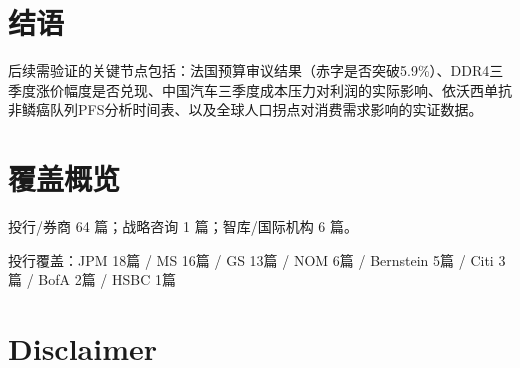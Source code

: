 \documentclass[11pt]{ctexart}
\begin{document}
\section{结语}
后续需验证的关键节点包括：法国预算审议结果（赤字是否突破5.9\%）、DDR4三季度涨价幅度是否兑现、中国汽车三季度成本压力对利润的实际影响、依沃西单抗非鳞癌队列PFS分析时间表、以及全球人口拐点对消费需求影响的实证数据。
\newpage
\section{覆盖概览}
投行/券商 64 篇；战略咨询 1 篇；智库/国际机构 6 篇。\par
投行覆盖：JPM 18篇 / MS 16篇 / GS 13篇 / NOM 6篇 / Bernstein 5篇 / Citi 3篇 / BofA 2篇 / HSBC 1篇\par
\section{Disclaimer}
\end{document}
